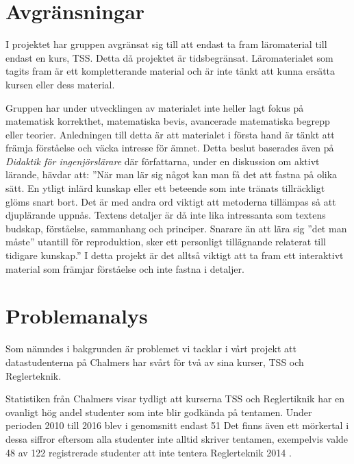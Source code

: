 \documentclass[]{article}
\begin{document}
\section{Avgränsningar}

I projektet har gruppen avgränsat sig till att endast ta fram läromaterial
till endast en kurs, TSS. Detta då projektet är tidsbegränsat.
Läromaterialet som tagits fram är ett kompletterande material och är inte
tänkt att kunna ersätta kursen eller dess material.

Gruppen har under utvecklingen av materialet inte heller lagt fokus på matematisk korrekthet, 
matematiska bevis, avancerade matematiska begrepp eller teorier.  Anledningen till detta är att 
materialet  i första hand är tänkt att främja förståelse och väcka intresse för ämnet. Detta beslut 
baserades även på \textit{Didaktik för ingenjörslärare} där författarna, under en diskussion om aktivt lärande, 
hävdar att: ”När man lär sig något kan man få det att fastna på olika sätt. En ytligt inlärd kunskap 
eller ett beteende som inte tränats tillräckligt glöms snart bort. Det är med andra ord viktigt att 
metoderna tillämpas så att djuplärande uppnås. Textens detaljer är då inte lika intressanta som textens 
budskap, förståelse, sammanhang och principer. Snarare än att lära sig ”det man måste” utantill för 
reproduktion, sker ett personligt tillägnande relaterat till tidigare kunskap.” I detta projekt är det 
alltså viktigt att ta fram ett interaktivt material som främjar förståelse och inte fastna i detaljer. 

\section{Problemanalys}


Som nämndes i bakgrunden är problemet vi tacklar i vårt projekt att
datastudenterna på Chalmers har svårt för två av sina kurser,
TSS och Reglerteknik.

Statistiken från Chalmers visar tydligt att kurserna TSS och Reglertiknik
har en ovanligt hög andel studenter som inte blir godkända på tentamen.
Under perioden 2010 till 2016 blev i genomsnitt endast 51
Det finns även ett mörkertal i dessa siffror eftersom alla studenter
inte alltid skriver tentamen, exempelvis valde 48 av 122 registrerade
studenter att inte tentera Reglerteknik 2014
\cite{kursinformation:ere102:14-15}.
\end{document}
